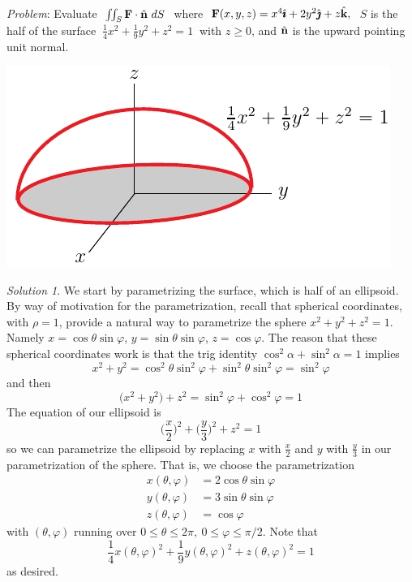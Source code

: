 \begin{eg}\label{eg:fluxIntegralL}
\noindent\textit{Problem}: Evaluate
$\ \dblInt_S\vF\cdot\hn\ dS\ $ where
$\ \vF(x,y,z)=x^4\hi+2y^2\hj+z\hk,\ $ $S$ is the half of the surface
$\ \frac{1}{4}x^2+\frac{1}{9}y^2+z^2=1\ $ with $z\ge 0$, and $\hat{\mathbf{n}}$ is the 
upward pointing unit normal. 

\begin{nfig}
\begin{center}
   \includegraphics{ellipsoid.pdf}
\end{center}
\end{nfig}

\medskip
\noindent\textit{Solution 1}.  We start by parametrizing the surface,
which is half of an ellipsoid. By way of motivation for the parametrization,
recall that spherical coordinates, with $\rho=1$,  provide a natural way to 
parametrize the sphere $x^2+y^2+z^2=1$. Namely $x=\cos\theta\sin\varphi$,
$y=\sin\theta\sin\varphi$, $z= \cos\varphi$. The reason that these spherical 
coordinates work is that the trig identity $\cos^2\alpha+\sin^2\alpha=1$ 
implies
\begin{equation*}
x^2+y^2 = \cos^2\theta\sin^2\varphi + \sin^2\theta\sin^2\varphi
        =\sin^2\varphi
\end{equation*}
and then 
\begin{equation*}
\big(x^2+y^2\big) + z^2 = \sin^2\varphi +\cos^2\varphi = 1
\end{equation*}
The equation of our ellipsoid is
\begin{equation*}
\Big(\frac{x}{2}\Big)^2 + \Big(\frac{y}{3}\Big)^2 + z^2 =1
\end{equation*}
so we can parametrize the ellipsoid by replacing $x$ with $\frac{x}{2}$
and $y$ with $\frac{y}{3}$ in our parametrization of the sphere.
That is,  we choose the parametrization
\begin{align*}
x(\theta,\varphi)&=2\cos\theta\sin\varphi\\
y(\theta,\varphi)&=3\sin\theta\sin\varphi\\
z(\theta,\varphi)&=\cos\varphi
\end{align*}
with $(\theta,\varphi)$ running over $0\le\theta\le 2\pi,\ 0\le\varphi\le\pi/2$.
Note that
\begin{equation*}
\frac{1}{4}x(\theta,\varphi)^2+\frac{1}{9}y(\theta,\varphi)^2
   +z(\theta,\varphi)^2=1
\end{equation*}
as desired. 


\end{eg}
